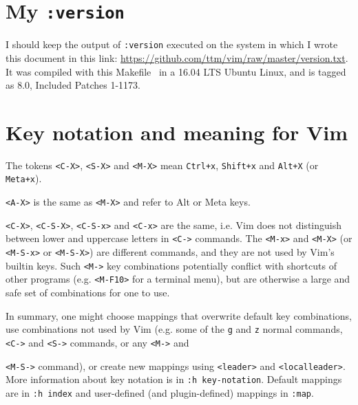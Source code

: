 \documentclass{article}
\newcommand{\ttt}[1] {
	\texttt{<#1>}}
\newcommand{\tttt}[1]{\texttt{#1}}
\begin{document}
\section{My \tttt{:version}}
I should keep the output of \tttt{:version} executed on the system
in which I wrote this document in this link:
\url{https://github.com/ttm/vim/raw/master/version.txt}.
It was compiled with this Makefile~\cite{makefile}
in a 16.04 LTS Ubuntu Linux,
and is tagged as 8.0, Included Patches 1-1173.

\section{Key notation and meaning for Vim}\label{sec:not}
The tokens \ttt{C-X}, \ttt{S-X} and \ttt{M-X}
mean \tttt{Ctrl+x}, \tttt{Shift+x} and \tttt{Alt+X}
(or \tttt{Meta+x}).
\ttt{A-X} is the same as \ttt{M-X} and refer to
Alt or Meta keys.
\ttt{C-X}, \ttt{C-S-X}, \ttt{C-S-x} and \ttt{C-x} are the same,
i.e. Vim does not distinguish between lower and uppercase 
letters in \ttt{C-} commands.
The \ttt{M-x} and \ttt{M-X} (or \ttt{M-S-x} or \ttt{M-S-X})
are different commands,
and they are not used by Vim's builtin keys.
Such \ttt{M-} key combinations potentially conflict
with shortcuts of other programs (e.g. \ttt{M-F10} for a terminal menu),
but are otherwise a large and safe set of combinations
for one to use.

In summary,
one might choose mappings that overwrite default key combinations,
use combinations not used by Vim (e.g. some of the \tttt{g} and \tttt{z}
normal commands, \ttt{C-} and \ttt{S-} commands, or any \ttt{M-} and
\ttt{M-S-} command), or
create new mappings using \tttt{<leader>} and \tttt{<localleader>}.
More information about key notation is in \tttt{:h key-notation}.
Default mappings are in \tttt{:h index} and user-defined (and plugin-defined) mappings
in \tttt{:map}.
\end{document}
